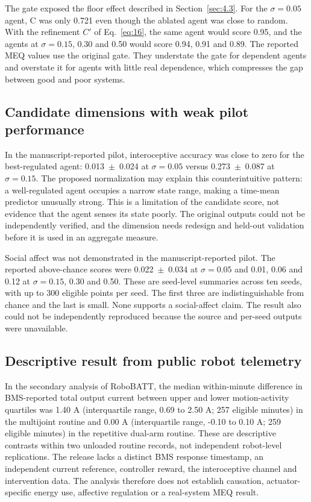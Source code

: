 \documentclass[twoside,11pt]{article}
\begin{document}
The gate exposed the floor effect described in Section~\ref{sec:4.3}. For the $\sigma = 0.05$ agent, C was only 0.721 even though the ablated agent was close to random. With the refinement $C'$ of Eq.~\eqref{eq:16}, the same agent would score 0.95, and the agents at $\sigma = 0.15$, 0.30 and 0.50 would score 0.94, 0.91 and 0.89. The reported MEQ values use the original gate. They understate the gate for dependent agents and overstate it for agents with little real dependence, which compresses the gap between good and poor systems.

\subsection{Candidate dimensions with weak pilot performance}\label{sec:6.4}

In the manuscript-reported pilot, interoceptive accuracy was close to zero for the best-regulated agent: 0.013~$\pm$~0.024 at $\sigma = 0.05$ versus 0.273~$\pm$~0.087 at $\sigma = 0.15.$ The proposed normalization may explain this counterintuitive pattern: a well-regulated agent occupies a narrow state range, making a time-mean predictor unusually strong. This is a limitation of the candidate score, not evidence that the agent senses its state poorly. The original outputs could not be independently verified, and the dimension needs redesign and held-out validation before it is used in an aggregate measure.

Social affect was not demonstrated in the manuscript-reported pilot. The reported above-chance scores were 0.022~$\pm$~0.034 at $\sigma = 0.05$ and 0.01, 0.06 and 0.12 at $\sigma = 0.15$, 0.30 and 0.50. These are seed-level summaries across ten seeds, with up to 300 eligible points per seed. The first three are indistinguishable from chance and the last is small. None supports a social-affect claim. The result also could not be independently reproduced because the source and per-seed outputs were unavailable.

\subsection{Descriptive result from public robot telemetry}\label{sec:6.5}

In the secondary analysis of RoboBATT, the median within-minute difference in BMS-reported total output current between upper and lower motion-activity quartiles was 1.40 A (interquartile range, 0.69 to 2.50 A; 257 eligible minutes) in the multijoint routine and 0.00 A (interquartile range, -0.10 to 0.10 A; 259 eligible minutes) in the repetitive dual-arm routine. These are descriptive contrasts within two unloaded routine records, not independent robot-level replications. The release lacks a distinct BMS response timestamp, an independent current reference, controller reward, the interoceptive channel and intervention data. The analysis therefore does not establish causation, actuator-specific energy use, affective regulation or a real-system MEQ result.
\end{document}
